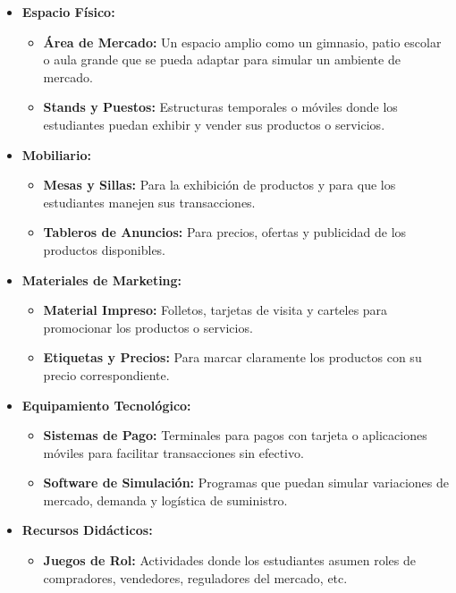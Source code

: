 \begin{itemize}
    \item \textbf{Espacio Físico:}
            \begin{itemize}
                \item \textbf{Área de Mercado:} Un espacio amplio como un gimnasio, patio escolar o aula grande que se pueda adaptar para simular un ambiente de mercado.
                \item \textbf{Stands y Puestos:} Estructuras temporales o móviles donde los estudiantes puedan exhibir y vender sus productos o servicios.
            \end{itemize}
    \item \textbf{Mobiliario:}
            \begin{itemize}
                \item \textbf{Mesas y Sillas:} Para la exhibición de productos y para que los estudiantes manejen sus transacciones.
                \item \textbf{Tableros de Anuncios:} Para precios, ofertas y publicidad de los productos disponibles.
            \end{itemize}
    \item \textbf{Materiales de Marketing:}
            \begin{itemize}
                \item \textbf{Material Impreso:} Folletos, tarjetas de visita y carteles para promocionar los productos o servicios.
                \item \textbf{Etiquetas y Precios:} Para marcar claramente los productos con su precio correspondiente.
            \end{itemize}
    \item \textbf{Equipamiento Tecnológico:}
            \begin{itemize}
                \item \textbf{Sistemas de Pago:} Terminales para pagos con tarjeta o aplicaciones móviles para facilitar transacciones sin efectivo.
                \item \textbf{Software de Simulación:} Programas que puedan simular variaciones de mercado, demanda y logística de suministro.
            \end{itemize}
    \item \textbf{Recursos Didácticos:}
            \begin{itemize}
                \item \textbf{Juegos de Rol:} Actividades donde los estudiantes asumen roles de compradores, vendedores, reguladores del mercado, etc.

\end{itemize}
\end{itemize}
